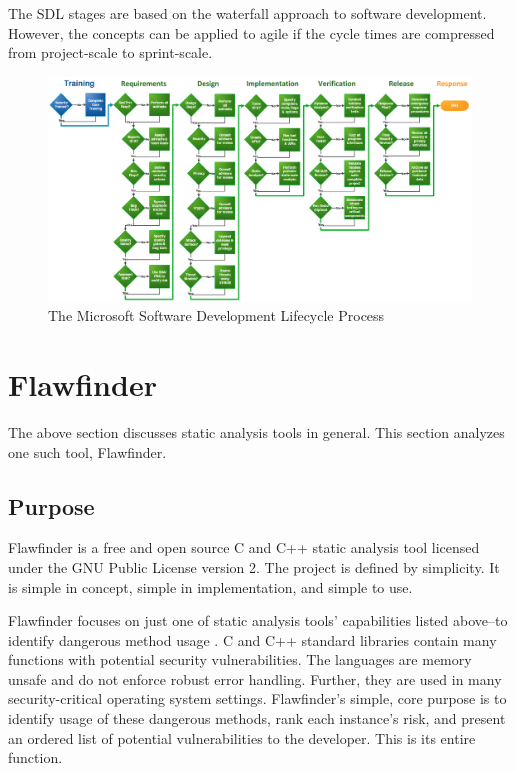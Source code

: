 \documentclass[journal]{IEEEtran}
\begin{document}
The SDL stages are based on the waterfall approach to software development. However, the concepts
can be applied to agile if the cycle times are compressed from project-scale to sprint-scale.

\onecolumn
\begin{landscape}
\begin{figure}
    \includegraphics[width=1.0\linewidth,height=1.0\textheight,keepaspectratio]{images/microsoft_sdl_process.png}
    \captionsetup{justification=centering}
    \caption{The Microsoft Software Development Lifecycle Process \cite{ms_sdl}}
    \label{fig:ms_sdl}
\end{figure}
\end{landscape}
\twocolumn


\section{Flawfinder}

The above section discusses static analysis tools in general. This section analyzes one such tool,
Flawfinder.

\subsection{Purpose}

Flawfinder is a free and open source C and C++ static analysis tool licensed under the GNU Public
License version 2. The project is defined by simplicity. It is simple in concept, simple in
implementation, and simple to use.

Flawfinder focuses on just one of static analysis tools' capabilities listed above--to identify
dangerous method usage \cite{flawfinder}. C and C++ standard libraries contain many functions with
potential security vulnerabilities. The languages are memory unsafe and do not enforce robust error
handling. Further, they are used in many security-critical operating system settings. Flawfinder's
simple, core purpose is to identify usage of these dangerous methods, rank each instance's risk, and
present an ordered list of potential vulnerabilities to the developer. This is its entire function.
\end{document}
